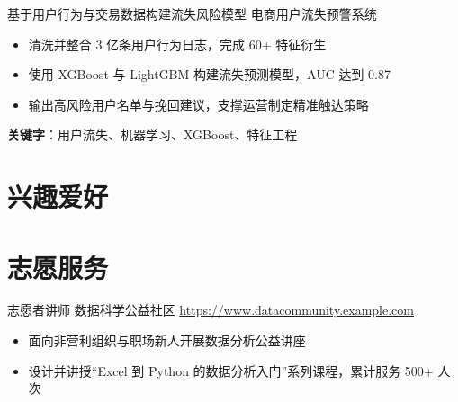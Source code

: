 \documentclass[a4paper, serif, 10pt]{moderncv}
\begin{document}
        {基于用户行为与交易数据构建流失风险模型}
        {电商用户流失预警系统}
        {}
        {}
        {\begin{itemize}
\item 清洗并整合 3 亿条用户行为日志，完成 60+ 特征衍生
\item 使用 XGBoost 与 LightGBM 构建流失预测模型，AUC 达到 0.87
\item 输出高风险用户名单与挽回建议，支撑运营制定精准触达策略
\end{itemize}
\textbf{关键字}：用户流失、机器学习、XGBoost、特征工程}
\section{兴趣爱好}

\section{志愿服务}

        {志愿者讲师}
        {数据科学公益社区}
        {\url{https://www.datacommunity.example.com}}
        {}
        {\begin{itemize}
\item 面向非营利组织与职场新人开展数据分析公益讲座
\item 设计并讲授“Excel 到 Python 的数据分析入门”系列课程，累计服务 500+ 人次
\end{itemize}}
\end{document}
